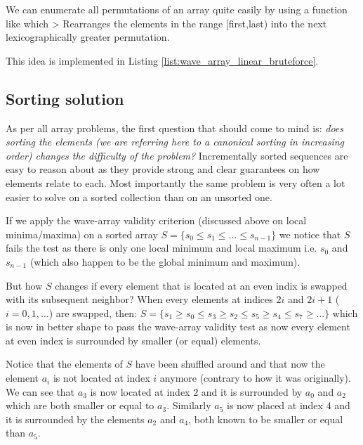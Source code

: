We can enumerate all permutations of an array quite easily by using a function like \inline{std::next_permutation](Iterator first, Iterator last)} which 
> Rearranges the elements in the range [first,last) into the next lexicographically greater permutation.

This idea is implemented in Listing \ref{list:wave_array_linear_bruteforce}.




\subsection{Sorting solution}
\label{wave_array:sec:sorting}

As per all array problems, the first question that should come to mind is: \textit{does sorting the elements (we are referring here to a canonical sorting in increasing order) changes the difficulty of the problem?} Incrementally sorted sequences are easy to reason about as they provide strong and clear guarantees on how elements relate to each. Most importantly the same problem is very often a lot easier to solve on a sorted collection than on an unsorted one.
 
If we apply the wave-array validity criterion (discussed above on local minima/maxima) on a sorted array $S=\{s_0 \leq s_1 \leq \ldots \leq s_{n-1}\}$ we notice that $S$ fails the test as there is only one local minimum and local maximum i.e. $s_0$ and $s_{n-1}$ (which also happen to be the global minimum and maximum).

But how $S$ changes if every
element that is located at an even indix is swapped with its subsequent neighbor? When every elements at indices $2i$ and $2i+1$ ($i=0,1,\ldots$) are swapped, then:
$S=\{s_1
\geq s_0 \leq s_3 \geq s_2 \leq s_5 \geq s_4 \leq s_7  \geq \ldots\}$ which is now in better shape to pass the wave-array validity test as now every element at even index is surrounded by smaller (or equal) elements. 

Notice that the elements of $S$ have been shuffled around and that now the element $a_i$ is not located at index $i$ anymore (contrary to how it was originally).
We can see that $a_3$ is now located at index $2$ and it is surrounded by $a_0$ and $a_2$ which are both smaller or equal to $a_3$.
Similarly $a_5$ is now placed at index $4$ and it is surrounded by the elements $a_2$ and $a_4$, both known to be smaller or equal than $a_5$.

